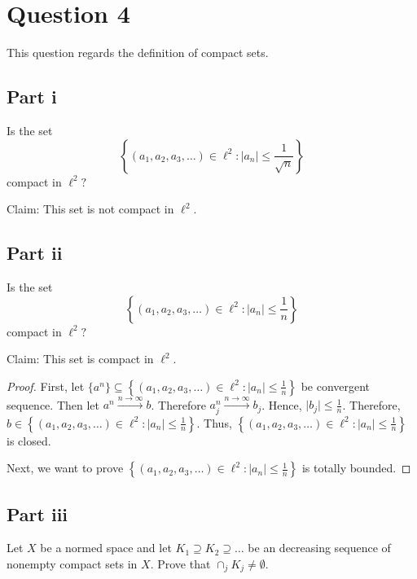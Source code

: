 \section{Question 4}

\begin{question}
    This question regards the definition of compact sets.
\end{question}

\subsection{Part i}

\begin{question}
    Is the set
    $$
    \left\{\left(a_1, a_2, a_3, \ldots\right) \in \ell^2:\left|a_n\right| \leq \frac{1}{\sqrt{n}}\right\}
    $$
    compact in $\ell^2 ?$
\end{question}

\begin{answer}
    Claim: This set is not compact in $\ell^2$.
\end{answer}

\subsection{Part ii}

\begin{question}
    Is the set
    $$
    \left\{\left(a_1, a_2, a_3, \ldots\right) \in \ell^2:\left|a_n\right| \leq \frac{1}{n}\right\}
    $$
    compact in $\ell^2 ?$
\end{question}

\begin{answer}
    Claim: This set is compact in $\ell^2$.
    \begin{proof}
        First, let $\{a^n\}\subseteq \left\{\left(a_1, a_2, a_3, \ldots\right) \in \ell^2:\left|a_n\right| \leq \frac{1}{n}\right\}$ be convergent sequence. Then let $a^n \xrightarrow{n \to \infty} b$. Therefore $a_j^n \xrightarrow{n \to \infty} b_j$. Hence, $\lvert b_j \rvert \leq \tfrac{1}{n}$. Therefore, $b \in \left\{\left(a_1, a_2, a_3, \ldots\right) \in \ell^2:\left|a_n\right| \leq \frac{1}{n}\right\}$. Thus, $\left\{\left(a_1, a_2, a_3, \ldots\right) \in \ell^2:\left|a_n\right| \leq \frac{1}{n}\right\}$ is closed.
        
        Next, we want to prove $\left\{\left(a_1, a_2, a_3, \ldots\right) \in \ell^2:\left|a_n\right| \leq \frac{1}{n}\right\}$ is totally bounded.
    \end{proof}
\end{answer}

\subsection{Part iii}

\begin{question}
   Let $X$ be a normed space and let $K_1 \supseteq K_2 \supseteq \ldots$ be an decreasing sequence of nonempty compact sets in $X$. Prove that $\cap_j K_j \neq \emptyset$.
\end{question}

\begin{answer}
    
\end{answer}
